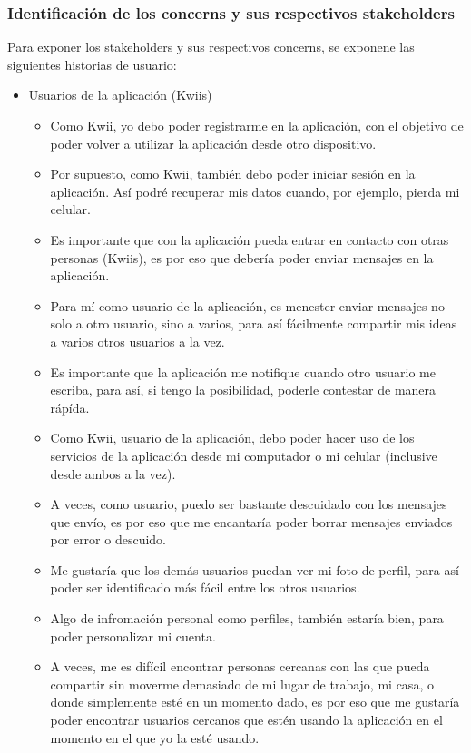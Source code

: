 \subsubsection{Identificación de los concerns y sus respectivos stakeholders}
Para exponer los stakeholders y sus respectivos concerns, se exponene las siguientes historias de usuario:

\begin{itemize}
    \item Usuarios de la aplicación (Kwiis)
    \begin{itemize}
        \item Como Kwii, yo debo poder registrarme en la aplicación, con el objetivo de poder volver a utilizar la aplicación desde otro dispositivo.
        \item Por supuesto, como Kwii, también debo poder iniciar sesión en la aplicación. Así podré recuperar mis datos cuando, por ejemplo, pierda mi celular.
        \item Es importante que con la aplicación pueda entrar en contacto con otras personas (Kwiis), es por eso que debería poder enviar mensajes en la aplicación.
        \item Para mí como usuario de la aplicación, es menester enviar mensajes no solo a otro usuario, sino a varios, para así fácilmente compartir mis ideas a varios otros usuarios a la vez.
        \item Es importante que la aplicación me notifique cuando otro usuario me escriba, para así, si tengo la posibilidad, poderle contestar de manera rápída.
        \item Como Kwii, usuario de la aplicación, debo poder hacer uso de los servicios de la aplicación desde mi computador o mi celular (inclusive desde ambos a la vez).
        \item A veces, como usuario, puedo ser bastante descuidado con los mensajes que envío, es por eso que me encantaría poder borrar mensajes enviados por error o descuido.
        \item Me gustaría que los demás usuarios puedan ver mi foto de perfil, para así poder ser identificado más fácil entre los otros usuarios.
        \item Algo de infromación personal como perfiles, también estaría bien, para poder personalizar mi cuenta.
        \item A veces, me es difícil encontrar personas cercanas con las que pueda compartir sin moverme demasiado de mi lugar de trabajo, mi casa, o donde simplemente esté en un momento dado, es por eso que me gustaría poder encontrar usuarios cercanos que estén usando la aplicación en el momento en el que yo la esté usando.

\end{itemize}
\end{itemize}
